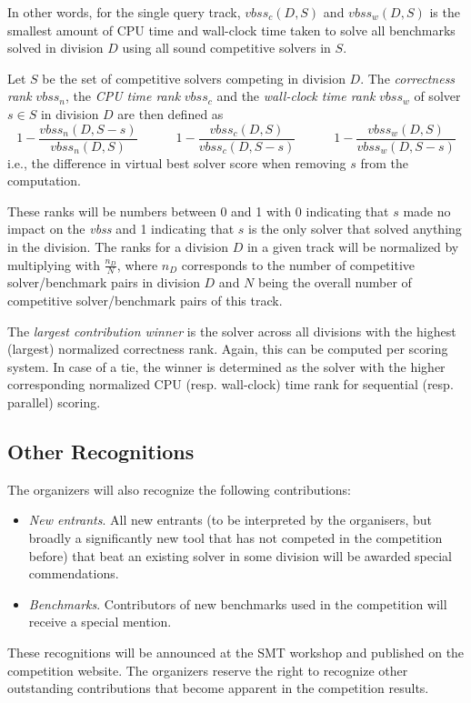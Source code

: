 \documentclass[12pt]{article}
\begin{document}
In other words, for the single query track,
$\mathit{vbss}_c(D,S)$  and $\mathit{vbss}_w(D,S)$ is the
smallest amount of CPU time and wall-clock time taken to solve all benchmarks
solved in division $D$ using all sound competitive solvers in $S$.

Let $S$ be the set of competitive solvers competing in division $D$.
The \emph{correctness rank} $\mathit{vbss}_n$, the \emph{CPU time rank}
$\mathit{vbss}_c$ and the \emph{wall-clock time rank} $\mathit{vbss}_w$
of solver $s \in S$ in division $D$ are then defined as
\[
1- \frac{\mathit{vbss}_n(D,S-s) }{ \mathit{vbss}_n (D,S)}
\hspace{3em}
1- \frac{\mathit{vbss}_c(D,S) }{ \mathit{vbss}_c(D,S-s)}
\hspace{3em}
1- \frac{\mathit{vbss}_w(D,S) }{ \mathit{vbss}_w(D,S-s)}
\]
i.e., the difference in virtual best solver score when removing $s$ from the
computation.

These ranks will be numbers between 0 and 1 with 0 indicating that $s$ made no
impact on the \emph{vbss} and 1 indicating that $s$ is the only solver that
solved anything in the division.
%
The ranks for a division $D$ in a given track will be normalized by multiplying
with $\frac{n_D}{N}$, where $n_D$ corresponds to the number of competitive
solver/benchmark pairs in division $D$ and $N$ being the overall number of
competitive solver/benchmark pairs of this track.

The \emph{largest contribution winner} is the solver across all divisions with
the highest (largest) normalized correctness rank. Again, this can be computed
per scoring system. In case of a tie, the winner is determined as the solver
with the higher corresponding normalized CPU (resp. wall-clock) time rank for
sequential (resp. parallel) scoring.

\subsection{Other Recognitions}

The organizers will also recognize the following contributions:
%
\begin{itemize}
\item \emph{New entrants}. All new entrants (to be interpreted by the organisers, but broadly a significantly new tool that has not competed in the competition before) that beat an existing solver in some division will be awarded special commendations.
\item \emph{Benchmarks}. Contributors of new benchmarks used in the competition will receive a special mention.
\end{itemize}
%
These recognitions will be announced at the SMT workshop and published on the competition website. 
The organizers reserve the right to recognize other outstanding
contributions that become apparent in the competition results.
\end{document}
